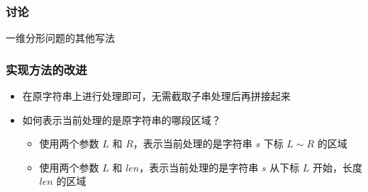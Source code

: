\begin{frame}[fragile]
    \frametitle{讨论}

    \begin{block}{}
        \vspace{.5cm}
        \begin{center}
            {\Large 一维分形问题的其他写法}
        \end{center}
        \vspace{.5cm}
    \end{block}
\end{frame}

\begin{frame}[fragile]
    \frametitle{实现方法的改进}
    \begin{itemize}
        \item 在原字符串上进行处理即可，无需截取子串处理后再拼接起来
        \item 如何表示当前处理的是原字符串的哪段区域？
        \begin{itemize}
            \item<2-> 使用两个参数 $L$ 和 $R$，表示当前处理的是字符串 $s$ 下标 $L \sim R$ 的区域
            \item<3-> 使用两个参数 $L$ 和 $len$，表示当前处理的是字符串 $s$ 从下标 $L$ 开始，长度 $len$ 的区域
        \end{itemize}
    \end{itemize}
\end{frame}

